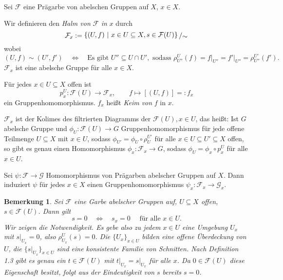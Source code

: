 \documentclass[11pt]{book}
\newtheorem{remark}[theorem]{Bemerkung}
\theoremstyle{nonumberbreak}
\newenvironment{pr}[1][]{\ifthenelse{\equal{#1}{}}{\proof}{\proof[#1]}\rm}{\endproof}
\newenvironment{bemdefin}[1][]{\ifthenelse{\equal{#1}{}}{\bemdefini}{\bemdefini[#1]}\rm}{\endbemdefini}
\newcommand{\slant}[2]{{\raisebox{.1em}{$#1$}\left/\raisebox{-.1em}{$#2$}\right.}}
\begin{document}
\begin{spacing}{1.4}
\begin{bemdefin} %
Sei $\mathcal{F}$ eine Prägarbe von abelschen Gruppen auf $X$, $x \in X$.
\begin{compactenum}
\item Wir definieren den \textit{Halm von} $\mathcal{F}$ \textit{in} $x$ durch
$$\mathcal{F}_x := \slant{\{ (U,f) \ \vert \ x \in U \subseteq X, s \in \mathcal{F}(U) \}}{\sim}$$
wobei
$$(U,f) \sim (U',f') \quad \Longleftrightarrow \quad \textrm{Es gibt } U'' \subseteq U \cap U', \textrm{ sodass } \rho^{U}_{U''}(f) = f \vert_{U''} = f' \vert_{U''} = \rho^{U'}_{U''} (f').$$
$\mathcal{F}_x$ ist eine abelsche Gruppe für alle $x \in X$.
\item Für jedes $x \in U \subseteq X$ offen ist 
$$p_x^{U}: \mathcal{F}(U) \longrightarrow \mathcal{F}_x, \qquad f \mapsto [(U,f)] =: f_x$$
ein Gruppenhomomorphismus. $f_x$ heißt \textit{Keim von} $f$ in $x$.
\item $\mathcal{F}_x$ ist der Kolimes des filtrierten Diagramms der $\mathcal{F}(U), x\in U$, das heißt: Ist $G$ abelsche Gruppe und $\phi_U: \mathcal{F}(U) \longrightarrow G$ Gruppenhomomorphismus für jede offene Teilmenge $U\subseteq X$ mit $x \in U$, sodass $\phi_{U'} = \phi_U \circ\rho_{U}^{U'}$ für alle $x \in U \subseteq U' \subseteq X$ offen, so gibt es genau einen Homomorphismus $\phi_x: \mathcal{F}_x \longrightarrow G$, sodass $\phi_U = \phi_x \circ p_x^{U}$ für alle $ x \in U$.
\item Sei $\psi: \mathcal{F} \longrightarrow \mathcal{G}$ Homomorphismus von Prägarben abelscher Gruppen auf $X$. Dann induziert $\psi$ für jedes $x \in X$ einen Gruppenhomomorphismus $\psi_x: \mathcal{F}_x \longrightarrow \mathcal{G}_x$.
\end{compactenum}

\end{bemdefin}

\begin{remark} %
Sei $\mathcal{F}$ eine Garbe abelscher Gruppen auf, $U \subseteq X$ offen, $s \in \mathcal{F}(U)$. Dann gilt
$$s=0 \quad \Longleftrightarrow \quad s_x =0 \quad \textrm{ für alle } x \in U.$$
\begin{pr}
Wir zeigen die Notwendigkeit. Es gebe also zu jedem $x \in U$ eine Umgebung $U_x$ mit $s\vert_{U_x}=0$, also $\rho^{U}_{U_x}(s)=0$. Die $\{U_x\}_{x \in U}$ bilden eine offene Überdeckung von $U$, die $\{s \vert_{U_x}\}_{x \in U}$ sind eine konsistente  Familie von Schnitten. Nach Definition 1.3 gibt es genau ein $t \in \mathcal{F}(U)$ mit $t \vert_{U_x} = s \vert_{U_x}$ für alle $x$. Da $0 \in \mathcal{F}(U)$ diese Eigenschaft besitzt, folgt aus der Eindeutigkeit von $s$ bereits $s=0$.
\end{pr}
\end{remark}


\end{spacing}
\end{document}
